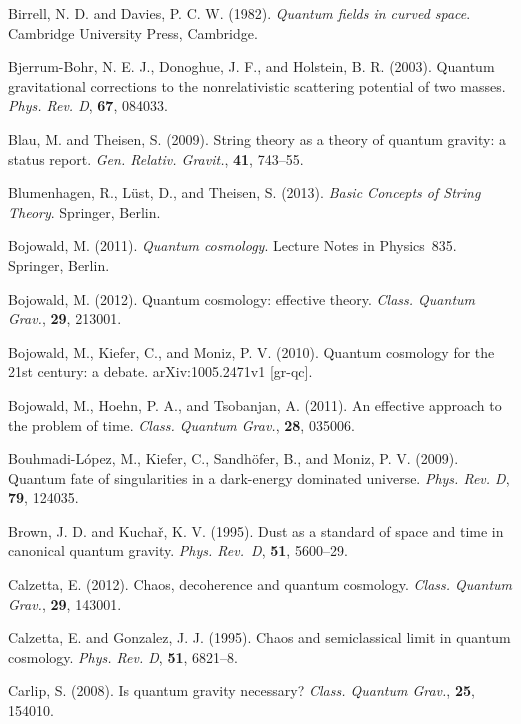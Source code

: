 \documentclass[12pt]{article}
\begin{document}
\bibitem{} Birrell, N. D. and Davies, P. C. W. (1982).
           {\em Quantum fields in curved space}. Cambridge University Press,
           Cambridge.

\bibitem{} Bjerrum-Bohr, N. E. J., Donoghue, J. F., and
           Holstein, B. R. (2003). Quantum gravitational corrections
           to the nonrelativistic scattering potential of two masses.
           {\em Phys. Rev. D}, {\bf 67}, 084033.

\bibitem{} Blau, M. and Theisen, S. (2009).
           String theory as a theory of quantum gravity: a status
           report. {\em Gen. Relativ. Gravit.}, {\bf 41}, 743--55.

\bibitem{} Blumenhagen, R., L\"ust, D., and Theisen, S. (2013).
{\em Basic Concepts of String Theory}. Springer, Berlin.

\bibitem{} Bojowald, M. (2011). {\em Quantum cosmology}. 
           Lecture Notes in Physics~835. Springer, Berlin.

\bibitem{} Bojowald, M. (2012). Quantum cosmology: effective theory.
       {\em Class. Quantum Grav.}, {\bf 29}, 213001.

\bibitem{} Bojowald, M., Kiefer, C., and Moniz, P. V. (2010).
           Quantum cosmology for the 21st century: a debate.
           arXiv:1005.2471v1 [gr-qc].

\bibitem{} Bojowald, M., Hoehn, P. A., and Tsobanjan, A. (2011).
       An effective approach to the problem of time.
       {\em Class. Quantum Grav.}, {\bf 28}, 035006.

\bibitem{} Bouhmadi-L\'opez, M., Kiefer, C., Sandh\"ofer, B., and
           Moniz, P. V. (2009).
           Quantum fate of singularities in a dark-energy dominated
           universe. {\em Phys. Rev. D}, {\bf 79}, 124035.

\bibitem{} Brown, J. D. and Kucha\v{r}, K. V. (1995). Dust as a standard
           of space and time in canonical quantum gravity.
           {\em Phys. Rev.~D}, {\bf 51}, 5600--29.

\bibitem{} Calzetta, E. (2012). Chaos, decoherence and quantum
  cosmology. {\em Class. Quantum Grav.}, {\bf 29}, 143001.

\bibitem{} Calzetta, E. and Gonzalez, J. J. (1995). 
          Chaos and semiclassical limit in quantum cosmology.
          {\em Phys. Rev. D}, {\bf 51}, 6821--8.

\bibitem{} Carlip, S. (2008). Is quantum gravity necessary? 
          {\em Class. Quantum Grav.}, {\bf 25}, 154010.
\end{document}
